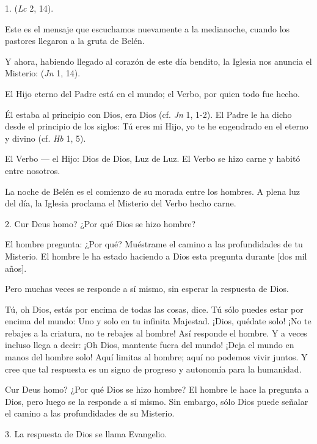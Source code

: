 				\begin{body}
					1.  (\emph{Lc} 2, 14).
					
					Este es el mensaje que escuchamos nuevamente a la medianoche, cuando los pastores llegaron a la gruta de Belén.
					
					Y ahora, habiendo llegado al corazón de este día bendito, la Iglesia nos anuncia el Misterio:  (\emph{Jn} 1, 14).
					
					El Hijo eterno del Padre está en el mundo; el Verbo, por quien todo fue hecho.
					
					Él estaba al principio con Dios, era Dios (cf. \emph{Jn} 1, 1-2). El Padre le ha dicho desde el principio de los siglos: Tú eres mi Hijo, yo te he engendrado en el  eterno y divino (cf. \emph{Hb} 1, 5).
					
					El Verbo --- el Hijo: Dios de Dios, Luz de Luz. El Verbo se hizo carne y habitó entre nosotros.
					
					La noche de Belén es el comienzo de su morada entre los hombres. A plena luz del día, la Iglesia proclama el Misterio del Verbo hecho carne.
					
					2. Cur Deus homo? ¿Por qué Dios se hizo hombre?
					
					El hombre pregunta: ¿Por qué? Muéstrame el camino a las profundidades de tu Misterio. El hombre le ha estado haciendo a Dios esta pregunta durante {[}dos mil años{]}.
					
					Pero muchas veces se responde a sí mismo, sin esperar la respuesta de Dios.
					
					Tú, oh Dios, estás por encima de todas las cosas, dice. Tú sólo puedes estar por encima del mundo: Uno y solo en tu infinita Majestad. ¡Dios, quédate solo! ¡No te rebajes a la criatura, no te rebajes al hombre! Así responde el hombre. Y a veces incluso llega a decir: ¡Oh Dios, mantente fuera del mundo! ¡Deja el mundo en manos del hombre solo! Aquí limitas al hombre; aquí no podemos vivir juntos. Y cree que tal respuesta es un signo de progreso y autonomía para la humanidad.
					
					Cur Deus homo? ¿Por qué Dios se hizo hombre? El hombre le hace la pregunta a Dios, pero luego se la responde a sí mismo. Sin embargo, sólo Dios puede señalar el camino a las profundidades de su Misterio.
					
					3. La respuesta de Dios se llama Evangelio.
					

\end{body}
